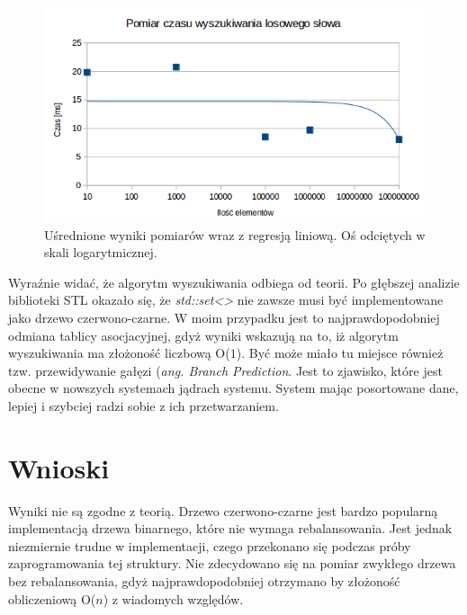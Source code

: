\documentclass[11pt,a4paper]{article}
\begin{document}
\begin{figure}[htbp]
\begin{center}
	\includegraphics[scale=0.7]{../wyniki/wykres.png}
\end{center}
\caption{Uśrednione wyniki pomiarów wraz z regresją liniową. Oś odciętych w skali logarytmicznej.}
\end{figure}

Wyraźnie widać, że algorytm wyszukiwania odbiega od teorii. Po głębszej analizie biblioteki STL okazało się, że \textit{std::set<>} nie zawsze musi być implementowane jako drzewo czerwono-czarne. W moim przypadku jest to najprawdopodobniej odmiana tablicy asocjacyjnej, gdyż wyniki wskazują na to, iż algorytm wyszukiwania ma złożoność liczbową O($1$). Być może miało tu miejsce również tzw. przewidywanie gałęzi (\textit{ang. Branch Prediction}. Jest to zjawisko, które jest obecne w nowszych systemach jądrach systemu. System mając posortowane dane, lepiej i szybciej radzi sobie z ich przetwarzaniem.

\newpage

\section{Wnioski}
\hspace{4ex}Wyniki nie są zgodne z teorią. Drzewo czerwono-czarne jest bardzo popularną implementacją drzewa binarnego, które nie wymaga rebalansowania. Jest jednak niezmiernie trudne w implementacji, czego przekonano się podczas próby zaprogramowania tej struktury. Nie zdecydowano się na pomiar zwykłego drzewa bez rebalansowania, gdyż najprawdopodobniej otrzymano by złożoność obliczeniową O($n$) z wiadomych względów.
 
\end{document}
